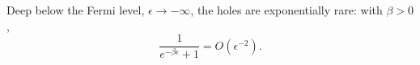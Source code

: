 \documentclass{article}
\begin{document}
Deep below the Fermi level, $\epsilon\to-\infty$, the holes are exponentially rare: with $\beta>0$,
\begin{equation}
\frac{1}{e^{-\beta\epsilon}+1} = O(\epsilon^{-2}) .
\label{eq:tail}
\end{equation}
\end{document}
